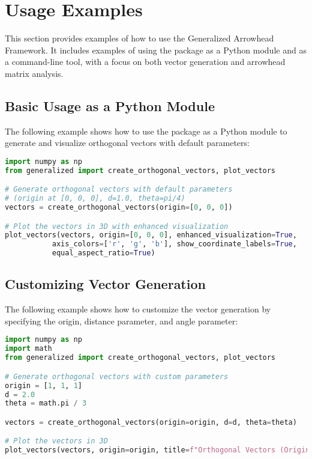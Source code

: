 \newpage
\section{Usage Examples}

This section provides examples of how to use the Generalized Arrowhead Framework. It includes examples of using the package as a Python module and as a command-line tool, with a focus on both vector generation and arrowhead matrix analysis.

\subsection{Basic Usage as a Python Module}

The following example shows how to use the package as a Python module to generate and visualize orthogonal vectors with default parameters:

\begin{lstlisting}[language=Python]
import numpy as np
from generalized import create_orthogonal_vectors, plot_vectors

# Generate orthogonal vectors with default parameters
# (origin at [0, 0, 0], d=1.0, theta=pi/4)
vectors = create_orthogonal_vectors(origin=[0, 0, 0])

# Plot the vectors in 3D with enhanced visualization
plot_vectors(vectors, origin=[0, 0, 0], enhanced_visualization=True, 
           axis_colors=['r', 'g', 'b'], show_coordinate_labels=True, 
           equal_aspect_ratio=True)
\end{lstlisting}

\subsection{Customizing Vector Generation}

The following example shows how to customize the vector generation by specifying the origin, distance parameter, and angle parameter:

\begin{lstlisting}[language=Python]
import numpy as np
import math
from generalized import create_orthogonal_vectors, plot_vectors

# Generate orthogonal vectors with custom parameters
origin = [1, 1, 1]
d = 2.0
theta = math.pi / 3

vectors = create_orthogonal_vectors(origin=origin, d=d, theta=theta)

# Plot the vectors in 3D
plot_vectors(vectors, origin=origin, title=f"Orthogonal Vectors (Origin={origin}, d={d}, theta={theta})")
\end{lstlisting}


